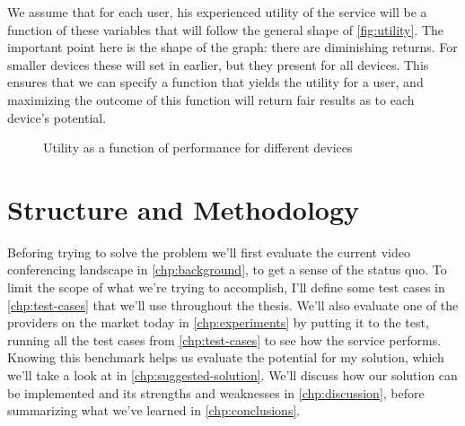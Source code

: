 We assume that for each user, his experienced utility of the service will be a function of these variables that will follow the general shape of \autoref{fig:utility}. The important point here is the shape of the graph: there are diminishing returns. For smaller devices these will set in earlier, but they present for all devices. This ensures that we can specify a function that yields the utility for a user, and maximizing the outcome of this function will return fair results as to each device's potential.

\begin{figure}
    \centering
    \caption{Utility as a function of performance for different devices}
    \label{fig:utility}
\end{figure}


\section{Structure and Methodology}

Beforing trying to solve the problem we'll first evaluate the current video conferencing landscape in \autoref{chp:background}, to get a sense of the status quo. To limit the scope of what we're trying to accomplish, I'll define some test cases in \autoref{chp:test-cases} that we'll use throughout the thesis. We'll also evaluate one of the providers on the market today in \autoref{chp:experiments} by putting it to the test, running all the test cases from \autoref{chp:test-cases} to see how the service performs. Knowing this benchmark helps us evaluate the potential for my solution, which we'll take a look at in \autoref{chp:suggested-solution}. We'll discuss how our solution can be implemented and its strengths and weaknesses in \autoref{chp:discussion}, before summarizing what we've learned in \autoref{chp:conclusions}.


